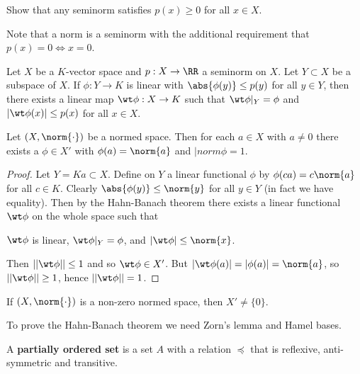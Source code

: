 \begin{exer}
  Show that any seminorm satisfies $p(x) \geq 0$ for all $x \in X$.
\end{exer}

\begin{rmk}
  Note that a norm is a seminorm with the additional requirement that $p(x)=0 \iff x=0$.
\end{rmk}

\begin{thm}
  Let $X$ be a $K$-vector space and $p: X \to \RR$ a seminorm on $X$.
  Let $Y \subset X$ be a subspace of $X$.
  If $\phi:Y \to K$ is linear with $\abs{\phi(y)}\leq p(y)$ for all $y \in Y$, then there exists a linear map $\wt \phi:X \to K$ such that $\wt\phi|_Y=\phi$ and $|\wt\phi(x)|\leq p(x)$ for all $x \in X$.
\end{thm}

\begin{cor}
  Let $(X,\norm{\cdot})$ be a normed space.
  Then for each $a \in X$ with $a \neq 0$ there exists a $\phi \in X'$ with $\phi(a)=\norm{a}$ and $|norm{\phi}=1$.
\end{cor}

\begin{proof}
  Let $Y = Ka \subset X$.
  Define on $Y$ a linear functional $\phi$ by $\phi(ca) = c\norm{a}$ for all $c \in K$.
  Clearly $\abs{\phi(y)} \leq \norm{y}$ for all $y \in Y$ (in fact we have equality).
  Then by the Hahn-Banach theorem there exists a linear functional $\wt\phi$ on the whole space such that
  \begin{enum}
    \io $\wt\phi$ is linear,
    \io $\wt\phi|_Y=\phi$, and
    \io $|\wt\phi| \leq \norm{x}$.
  \end{enum}
  Then $||\wt\phi|| \leq 1$ and so $\wt\phi \in X'$.
  But $|\wt\phi(a)| = |\phi(a)| = \norm{a}$, so $||\wt\phi||\geq 1$, hence $||\wt\phi||=1$.
\end{proof}

\begin{cor}
  If $(X,\norm{\cdot})$ is a non-zero normed space, then $X' \neq \{0\}$.
\end{cor}

To prove the Hahn-Banach theorem we need Zorn's lemma and Hamel bases.

\begin{defn}
  A \textbf{partially ordered set} is a set $A$ with a relation $\preceq$ that is reflexive, anti-symmetric and transitive.
\end{defn}

